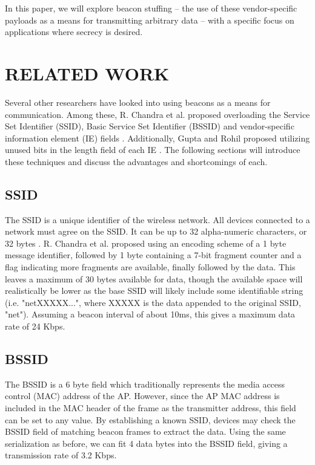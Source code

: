 \documentclass[letterpaper, 10 pt, conference]{ieeeconf}  %
\begin{document}
In this paper, we will explore beacon stuffing -- the use of these vendor-specific payloads as a means for transmitting arbitrary data -- with a specific focus on applications where secrecy is desired.


\section{RELATED WORK}

Several other researchers have looked into using beacons as a means for communication. Among these, R. Chandra et al. proposed overloading the Service Set Identifier (SSID), Basic Service Set Identifier (BSSID) and vendor-specific information element (IE) fields \cite{c1}.  Additionally, Gupta and Rohil proposed utilizing unused bits in the length field of each IE \cite{c2}.  The following sections will introduce these techniques and discuss the advantages and shortcomings of each.

\subsection{SSID}

The SSID is a unique identifier of the wireless network. All devices connected to a network must agree on the SSID.  It can be up to 32 alpha-numeric characters, or 32 bytes \cite{c3}. R. Chandra et al. proposed using an encoding scheme of a 1 byte message identifier, followed by 1 byte containing a 7-bit fragment counter and a flag indicating more fragments are available, finally followed by the data.  This leaves a maximum of 30 bytes available for data, though the available space will realistically be lower as the base SSID will likely include some identifiable string (i.e. "netXXXXX...", where XXXXX is the data appended to the original SSID, "net").  Assuming a beacon interval of about 10ms, this gives a maximum data rate of 24 Kbps.

\subsection{BSSID}

The BSSID is a 6 byte field which traditionally represents the media access control (MAC) address of the AP.  However, since the AP MAC address is included in the MAC header of the frame as the transmitter address, this field can be set to any value. By establishing a known SSID, devices may check the BSSID field of matching beacon frames to extract the data. Using the same serialization as before, we can fit 4 data bytes into the BSSID field, giving a transmission rate of 3.2 Kbps.
\end{document}
